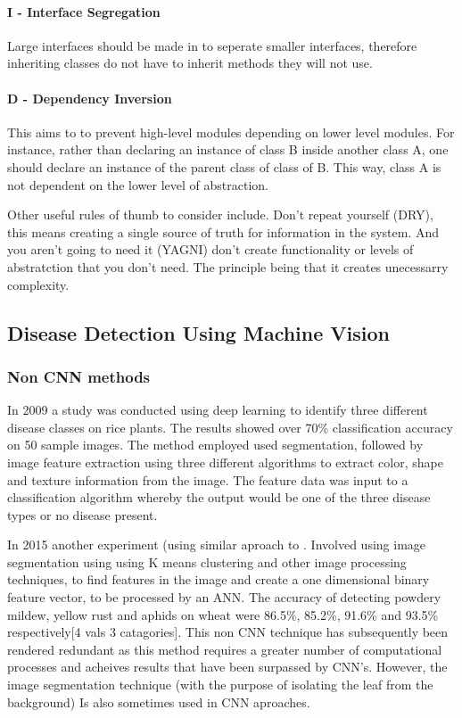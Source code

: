       \paragraph{I - Interface Segregation}
        Large interfaces should be made in to seperate smaller interfaces, therefore inheriting classes do not have to inherit methods they will not use.
      \paragraph{D - Dependency Inversion}
        This aims to to prevent high-level modules depending on lower level modules. For instance, rather than declaring an instance of class B inside another class A, one should declare an instance of the parent class of class of B. This way, class A is not dependent on the lower level of abstraction.

    Other useful rules of thumb to consider include. Don't repeat yourself (DRY), this means creating a single source of truth for information in the system. And you aren't going to need it (YAGNI) don't create functionality or levels of abstratction that you don't need. The principle being that it creates unecessarry complexity.
  \subsection{Disease Detection Using Machine Vision}
  \subsubsection{Non CNN methods}
    In 2009 a study \citep{Anthonys2009} was conducted using deep learning to identify three different disease classes on rice plants. The results showed over 70\% classification accuracy on 50 sample images. The method employed used segmentation, followed by image feature extraction using three different algorithms to extract color, shape and texture information from the image. The feature data was input to a classification algorithm whereby the output would be one of the three disease types or no disease present.
    \par
    In 2015 another experiment (using similar aproach to \citep{Anthonys2009}. Involved using image segmentation
    using using K means clustering and other image processing techniques, to find features in the image and create a one dimensional binary feature vector, to be processed by an ANN. \citep{Khirade2015} The accuracy of detecting powdery mildew, yellow rust and aphids on wheat were 86.5\%, 85.2\%, 91.6\% and 93.5\% respectively[4 vals 3 catagories].
    This non CNN technique has subsequently been rendered redundant as this method requires a greater number of
    computational processes and acheives results that have been surpassed by CNN's. However, the image segmentation technique (with the purpose of isolating the leaf from the background) Is also sometimes used in CNN aproaches.
